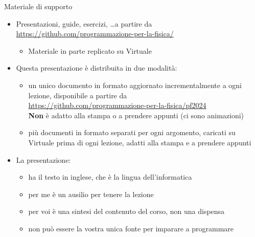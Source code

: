 \begin{frame}{Materiale di supporto}

  \begin{itemize}[<+->]

  \item Presentazioni, guide, esercizi, \ldots a partire da
    \url{https://github.com/programmazione-per-la-fisica/}
    \begin{itemize}[<.->]
    \item Materiale in parte replicato su Virtuale
    \end{itemize}

  \item Questa presentazione è distribuita in due modalità:
    \begin{itemize}[<.->]
    \item un unico documento in formato  aggiornato incrementalmente a
      ogni lezione, disponibile a partire da\\
      {\smaller \url{https://github.com/programmazione-per-la-fisica/pf2024}}\\
      \textbf{Non} è adatto alla stampa o a prendere appunti (ci sono
      animazioni)
    \item più documenti in formato  separati per ogni argomento,
      caricati su Virtuale prima di ogni lezione, adatti alla stampa e a
      prendere appunti
    \end{itemize}

  \item La presentazione:
    \begin{itemize}[<.->]
    \item ha il testo in inglese, che è la lingua dell'informatica
    \item per me è un ausilio per tenere la lezione
    \item per voi è una sintesi del contenuto del corso, non una dispensa
    \item non può essere la vostra unica fonte per imparare a programmare
    \end{itemize}

  \end{itemize}

\end{frame}

